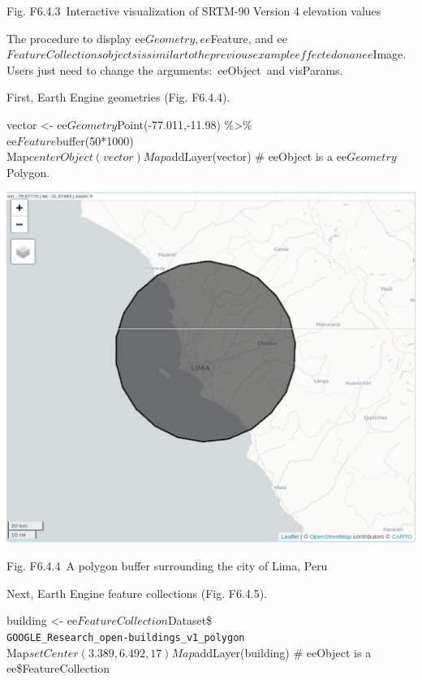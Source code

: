 \documentclass[
  letterpaper,
  DIV=11,
  numbers=noendperiod]{scrreprt}
\begin{document}
Fig. F6.4.3~Interactive visualization of SRTM-90 Version 4 elevation
values

The procedure to display ee\(Geometry, ee\)Feature, and
ee\(FeatureCollections objects is similar to the previous example effected on an ee\)Image.
Users just need to change the arguments:~eeObject~and visParams.

First, Earth Engine geometries (Fig. F6.4.4).

vector \textless- ee\(Geometry\)Point(-77.011,-11.98) \%\textgreater\%\\
\hspace*{0.333em}ee\(Feature\)buffer(50*1000)\\
Map\(centerObject(vector) Map\)addLayer(vector) \# eeObject is a
ee\(Geometry\)Polygon.

\includegraphics{./F6/image46.png}

Fig. F6.4.4~A polygon buffer surrounding the city of Lima, Peru

Next, Earth Engine feature collections (Fig. F6.4.5).

building \textless- ee\(FeatureCollection\)Dataset\$\\
\hspace*{0.333em}\texttt{GOOGLE\_Research\_open-buildings\_v1\_polygon}\\
Map\(setCenter(3.389, 6.492, 17) Map\)addLayer(building) \# eeObject is
a ee\$FeatureCollection
\end{document}

